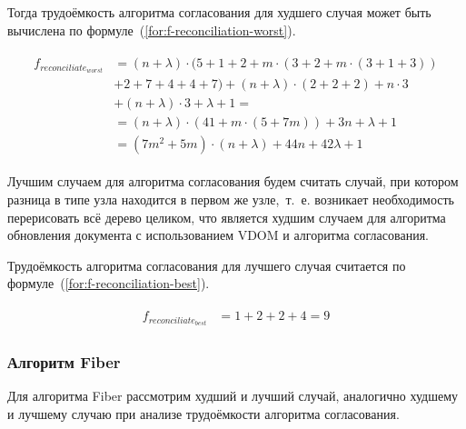 Тогда трудоёмкость алгоритма согласования для худшего случая может быть вычислена по формуле~(\ref{for:f-reconciliation-worst}).

\begin{align}
	\begin{split}
		\label{for:f-reconciliation-worst}
		f_{reconciliate_{worst}} &= (n + \lambda) \cdot (5 + 1 + 2 + m \cdot (3 + 2 + m \cdot (3 + 1 + 3)) \\
		&+ 2 + 7 + 4 + 4 + 7) + (n + \lambda) \cdot (2 + 2 + 2) + n \cdot 3 \\
		&+ (n + \lambda) \cdot 3 + \lambda + 1 =\\
		&= (n + \lambda) \cdot (41 + m \cdot (5 + 7m)) + 3n + \lambda + 1 \\
		&= (7m^2 + 5m)\cdot(n + \lambda) + 44n + 42\lambda + 1
	\end{split}
\end{align}

Лучшим случаем для алгоритма согласования будем считать случай, при котором разница в типе узла находится в первом же узле,~т.~е. возникает необходимость перерисовать всё дерево целиком, что является худшим случаем для алгоритма обновления документа с использованием VDOM и алгоритма согласования.

Трудоёмкость алгоритма согласования для лучшего случая считается по формуле~(\ref{for:f-reconciliation-best}).

\begin{align}
	\begin{split}
		\label{for:f-reconciliation-best}
		f_{reconciliate_{best}} &= 1 + 2 + 2 + 4 = 9
	\end{split}
\end{align}

\subsubsection{Алгоритм Fiber}

Для алгоритма Fiber рассмотрим худший и лучший случай, аналогично худшему и лучшему  случаю при анализе трудоёмкости алгоритма согласования.

